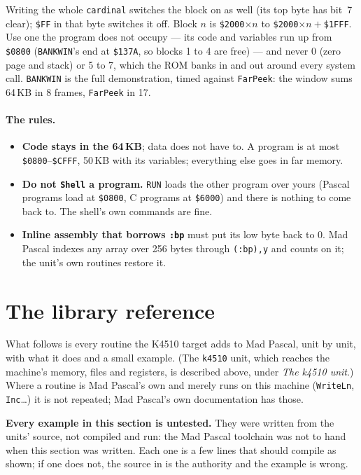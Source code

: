 \noindent Writing the whole \texttt{cardinal} switches the block on as
well (its top byte has bit~7 clear); \texttt{\$FF} in that byte switches
it off. Block $n$ is \texttt{\$2000}$\times n$ to
\texttt{\$2000}$\times n +$\texttt{\$1FFF}. Use one the program does
not occupy --- its code and variables run up from \texttt{\$0800}
(\texttt{BANKWIN}'s end at \texttt{\$137A}, so blocks 1 to 4 are
free) --- and never 0 (zero page and stack) or 5 to 7, which the ROM
banks in and out around every system call. \texttt{BANKWIN} is the
full demonstration, timed against \verb|FarPeek|: the window sums
64\,KB in 8 frames, \verb|FarPeek| in 17.

\paragraph{The rules.}
\begin{itemize}
\item \textbf{Code stays in the 64\,KB}; data does not have to. A
  program is at most \texttt{\$0800}--\texttt{\$CFFF}, 50\,KB with its
  variables; everything else goes in far memory.
\item \textbf{Do not \texttt{Shell} a program.} \verb|RUN| loads the
  other program over yours (Pascal programs load at \texttt{\$0800},
  C programs at \texttt{\$6000}) and there is nothing to come back to.
  The shell's own commands are fine.
\item \textbf{Inline assembly that borrows \texttt{:bp}} must put its
  low byte back to 0. Mad Pascal indexes any array over 256 bytes
  through \verb|(:bp),y| and counts on it; the unit's own routines
  restore it.
\end{itemize}

\section{The library reference}\label{sec:paslib}
What follows is every routine the K4510 target adds to Mad Pascal, unit by
unit, with what it does and a small example. (The \verb|k4510| unit, which
reaches the machine's memory, files and registers, is described above,
under \emph{The k4510 unit}.) Where a routine is Mad Pascal's
own and merely runs on this machine (\verb|WriteLn|, \verb|Inc|\ldots) it is
not repeated; Mad Pascal's own documentation has those.

\medskip\noindent\textbf{Every example in this section is untested.} They were
written from the units' source, not compiled and run: the Mad Pascal toolchain
was not to hand when this section was written. Each one is a few lines that
should compile as shown; if one does not, the source in 
is the authority and the example is wrong.

